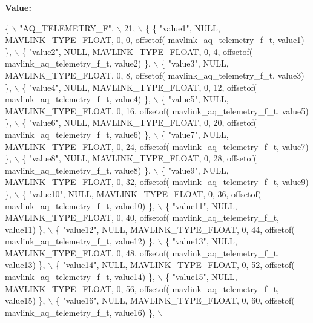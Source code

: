 {\bfseries Value\+:}
\begin{DoxyCode}
\{ \(\backslash\)
    \textcolor{stringliteral}{"AQ\_TELEMETRY\_F"}, \(\backslash\)
    21, \(\backslash\)
    \{  \{ \textcolor{stringliteral}{"value1"}, NULL, MAVLINK_TYPE_FLOAT, 0, 0, offsetof(
      mavlink_aq_telemetry_f_t, value1) \}, \(\backslash\)
         \{ \textcolor{stringliteral}{"value2"}, NULL, MAVLINK_TYPE_FLOAT, 0, 4, offsetof(
      mavlink_aq_telemetry_f_t, value2) \}, \(\backslash\)
         \{ \textcolor{stringliteral}{"value3"}, NULL, MAVLINK_TYPE_FLOAT, 0, 8, offsetof(
      mavlink_aq_telemetry_f_t, value3) \}, \(\backslash\)
         \{ \textcolor{stringliteral}{"value4"}, NULL, MAVLINK_TYPE_FLOAT, 0, 12, offsetof(
      mavlink_aq_telemetry_f_t, value4) \}, \(\backslash\)
         \{ \textcolor{stringliteral}{"value5"}, NULL, MAVLINK_TYPE_FLOAT, 0, 16, offsetof(
      mavlink_aq_telemetry_f_t, value5) \}, \(\backslash\)
         \{ \textcolor{stringliteral}{"value6"}, NULL, MAVLINK_TYPE_FLOAT, 0, 20, offsetof(
      mavlink_aq_telemetry_f_t, value6) \}, \(\backslash\)
         \{ \textcolor{stringliteral}{"value7"}, NULL, MAVLINK_TYPE_FLOAT, 0, 24, offsetof(
      mavlink_aq_telemetry_f_t, value7) \}, \(\backslash\)
         \{ \textcolor{stringliteral}{"value8"}, NULL, MAVLINK_TYPE_FLOAT, 0, 28, offsetof(
      mavlink_aq_telemetry_f_t, value8) \}, \(\backslash\)
         \{ \textcolor{stringliteral}{"value9"}, NULL, MAVLINK_TYPE_FLOAT, 0, 32, offsetof(
      mavlink_aq_telemetry_f_t, value9) \}, \(\backslash\)
         \{ \textcolor{stringliteral}{"value10"}, NULL, MAVLINK_TYPE_FLOAT, 0, 36, offsetof(
      mavlink_aq_telemetry_f_t, value10) \}, \(\backslash\)
         \{ \textcolor{stringliteral}{"value11"}, NULL, MAVLINK_TYPE_FLOAT, 0, 40, offsetof(
      mavlink_aq_telemetry_f_t, value11) \}, \(\backslash\)
         \{ \textcolor{stringliteral}{"value12"}, NULL, MAVLINK_TYPE_FLOAT, 0, 44, offsetof(
      mavlink_aq_telemetry_f_t, value12) \}, \(\backslash\)
         \{ \textcolor{stringliteral}{"value13"}, NULL, MAVLINK_TYPE_FLOAT, 0, 48, offsetof(
      mavlink_aq_telemetry_f_t, value13) \}, \(\backslash\)
         \{ \textcolor{stringliteral}{"value14"}, NULL, MAVLINK_TYPE_FLOAT, 0, 52, offsetof(
      mavlink_aq_telemetry_f_t, value14) \}, \(\backslash\)
         \{ \textcolor{stringliteral}{"value15"}, NULL, MAVLINK_TYPE_FLOAT, 0, 56, offsetof(
      mavlink_aq_telemetry_f_t, value15) \}, \(\backslash\)
         \{ \textcolor{stringliteral}{"value16"}, NULL, MAVLINK_TYPE_FLOAT, 0, 60, offsetof(
      mavlink_aq_telemetry_f_t, value16) \}, \(\backslash\)

\end{DoxyCode}

